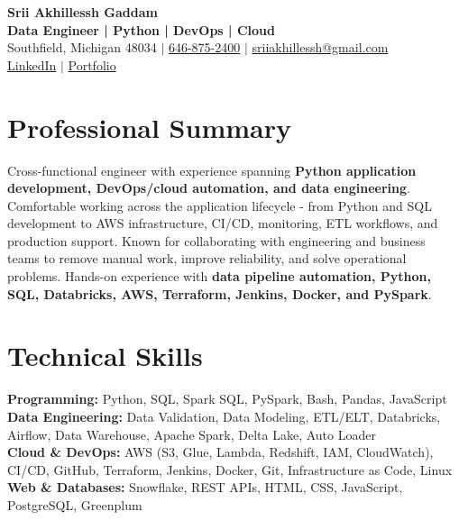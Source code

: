 \documentclass[letterpaper,10pt]{article}
\begin{document}
\fontsize{9.35pt}{10.45pt}\selectfont

\begin{center}
    {\LARGE \textbf{Srii Akhillessh Gaddam}} \\[-1pt]
    \textbf{Data Engineer | Python | DevOps | Cloud} \\[2pt]
    Southfield, Michigan 48034 $|$
    \href{tel:6468752400}{646-875-2400} $|$
    \href{mailto:sriiakhillessh@gmail.com}{sriiakhillessh@gmail.com} \\[1pt]
    \href{https://www.linkedin.com/in/srii-akhiilessh-gaddam-b48668191/}{LinkedIn} $|$
    \href{https://sriiakhillesshg.github.io/portfolio/}{Portfolio}
\end{center}
\vspace{-8pt}

\section{Professional Summary}
\small{Cross-functional engineer with experience spanning \textbf{Python application development, DevOps/cloud automation, and data engineering}. Comfortable working across the application lifecycle - from Python and SQL development to AWS infrastructure, CI/CD, monitoring, ETL workflows, and production support. Known for collaborating with engineering and business teams to remove manual work, improve reliability, and solve operational problems. Hands-on experience with \textbf{data pipeline automation, Python, SQL, Databricks, AWS, Terraform, Jenkins, Docker, and PySpark}.}

\section{Technical Skills}
\small{
\textbf{Programming:} Python, SQL, Spark SQL, PySpark, Bash, Pandas, JavaScript \\
\textbf{Data Engineering:} Data Validation, Data Modeling, ETL/ELT, Databricks, Airflow, Data Warehouse, Apache Spark, Delta Lake, Auto Loader \\
\textbf{Cloud \& DevOps:} AWS (S3, Glue, Lambda, Redshift, IAM, CloudWatch), CI/CD, GitHub, Terraform, Jenkins, Docker, Git, Infrastructure as Code, Linux \\
\textbf{Web \& Databases:} Snowflake, REST APIs, HTML, CSS, JavaScript, PostgreSQL, Greenplum
}
\end{document}
